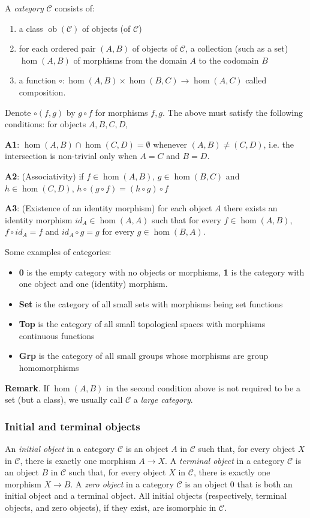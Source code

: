 \documentclass[10pt]{article}
\theoremstyle{plain}
\theoremstyle{definition}
\theoremstyle{remark}
\begin{document}
A \emph{category} $\mathcal{C}$ consists of:
\begin{enumerate}
\item a class $\operatorname{ob}(\mathcal{C})$ of objects (of $\mathcal{C}$)
\item for each ordered pair $(A,B)$ of objects of $\mathcal{C}$, a collection (such as
 a set) $\hom(A,B)$ of morphisms from the domain $A$ to the codomain $B$
\item a function $\circ:\hom(A,B)\times\hom(B,C)\to\hom(A,C)$ called composition.
\end{enumerate}

Denote $\circ(f,g)$ by $g \circ f$ for morphisms $f,g$. The above must satisfy the following conditions: for objects $A,B,C,D$,

\textbf{A1}: $\hom(A,B) \cap \hom(C,D)=\emptyset$ whenever $(A,B)\neq (C,D)$, i.e. the intersection is non-trivial only when $A=C$ and $B=D$.

\textbf{A2}: (Associativity) if $f \in \hom(A,B)$, $g\in\hom(B,C)$ and $h\in\hom(C,D)$, $h\circ (g\circ f)=(h\circ g)\circ f$

\textbf{A3}: (Existence of an identity morphism) for each object $A$ there exists an identity morphism $ {}id_{A}\in\hom(A,A)$ such that for every $f\in\hom(A,B)$, $f\circ id_{A}=f$ and $ {}id_{A}\circ g=g$ for every $g \in \hom(B,A)$.

Some examples of categories:
\begin{itemize}
\item \textbf{0} is the empty category with no objects or morphisms, \textbf{1} is the category with one object and one (identity) morphism.
\item \textbf{Set} is the category of all small sets with morphisms being set functions
\item \textbf{Top} is the category of all small topological spaces with morphisms continuous functions
\item \textbf{Grp} is the category of all small groups whose morphisms are group homomorphisms
\end{itemize}

\textbf{Remark}.  If $\hom(A,B)$ in the second condition above is not required to be a set (but a class), we usually call $\mathcal{C}$ a \emph{large category}.

\subsubsection{Initial and terminal objects}
An {\em initial object} in a category $\mathcal{C}$ is an object $A$ in $\mathcal{C}$ such that, for every object $X$ in $\mathcal{C}$, there is exactly one morphism $A \longrightarrow X$. A {\em terminal object} in a category $\mathcal{C}$ is an object $B$ in $\mathcal{C}$ such that, for every object $X$ in $\mathcal{C}$, there is exactly one morphism $X \longrightarrow B$. A {\em zero object} in a category $\mathcal{C}$ is an object $0$ that is both an initial object and a terminal object. All initial objects (respectively, terminal objects, and zero objects), if they exist, are isomorphic in $\mathcal{C}$.
\end{document}
